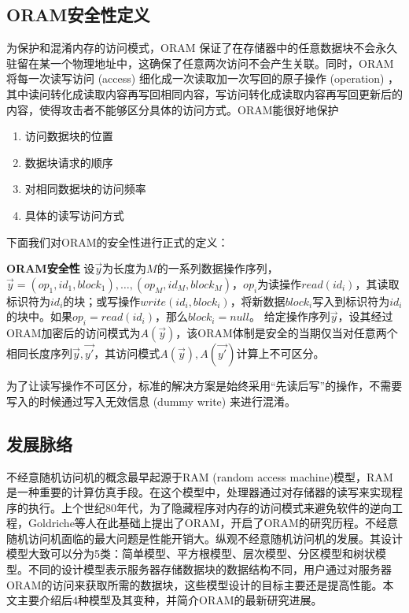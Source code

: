 \subsection{ORAM安全性定义}\par
为保护和混淆内存的访问模式，ORAM 保证了在存储器中的任意数据块不会永久驻留在某一个物理地址中，这确保了任意两次访问不会产生关联。同时，ORAM将每一次读写访问 (access) 细化成一次读取加一次写回的原子操作 (operation) ，其中读问转化成读取内容再写回相同内容，写访问转化成读取内容再写回更新后的内容，使得攻击者不能够区分具体的访问方式。ORAM能很好地保护
\begin{enumerate}
    \item 访问数据块的位置
    \item 数据块请求的顺序
    \item 对相同数据块的访问频率
    \item 具体的读写访问方式
\end{enumerate}
\par\noindent 下面我们对ORAM的安全性进行正式的定义：
\begin{definition}\textbf{ORAM安全性}
    \newline
    设$\vec{y}$为长度为$M$的一系列数据操作序列，$\vec{y}=(op_1,id_1,block_1),\ldots,(op_M,id_M,block_M)$，$op_i$为读操作$read(id_i)$，其读取标识符为$id_i$的块；或写操作$write(id_i,block_i)$，将新数据$block_i$写入到标识符为$id_i$的块中。如果$op_i=read(id_i)$，那么$block_i=null$。
    \newline
    给定操作序列$\vec{y}$，设其经过ORAM加密后的访问模式为$A(\vec{y})$，该ORAM体制是安全的当期仅当对任意两个相同长度序列$\vec{y}, \vec{y'}$，其访问模式$A(\vec{y}), A(\vec{y'})$计算上不可区分。
\end{definition}\par
为了让读写操作不可区分，标准的解决方案是始终采用“先读后写”的操作，不需要写入的时候通过写入无效信息 (dummy write) 来进行混淆。
\subsection{发展脉络}
不经意随机访问机的概念最早起源于RAM (random access machine)模型，RAM是一种重要的计算仿真手段。在这个模型中，处理器通过对存储器的读写来实现程序的执行。上个世纪80年代，为了隐藏程序对内存的访问模式来避免软件的逆向工程，Goldriche等人在此基础上提出了ORAM\cite{ref2}，开启了ORAM的研究历程。不经意随机访问机面临的最大问题是性能开销大。纵观不经意随机访问机的发展。其设计模型大致可以分为5类：简单模型、平方根模型\cite{ref5,ref6}、层次模型\cite{ref5}、分区模型\cite{ref7}和树状模型\cite{ref8,ref9}。不同的设计模型表示服务器存储数据块的数据结构不同，用户通过对服务器ORAM的访问来获取所需的数据块，这些模型设计的目标主要还是提高性能。本文主要介绍后4种模型及其变种，并简介ORAM的最新研究进展。